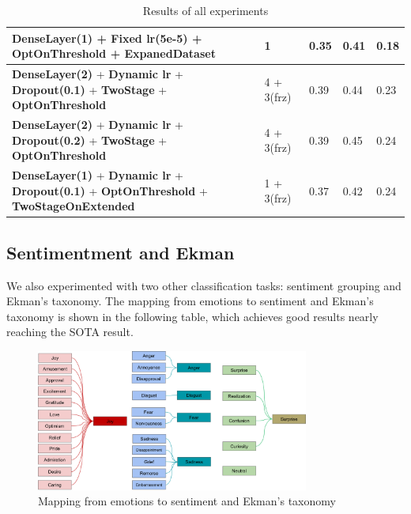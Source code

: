 \documentclass{article}
\begin{document}
\begin{table}[H]
\begin{tabular}{p{}p{}p{}p{}p{}}
    \hline
    \textbf{DenseLayer(1)} + \textbf{Fixed lr(5e-5)} + \textbf{OptOnThreshold} + \textbf{ExpanedDataset}                         & 1               & 0.35          & 0.41          & 0.18         \\
    \hline
    \textbf{DenseLayer(2)} + \textbf{Dynamic lr} + \textbf{Dropout(0.1)} + \textbf{TwoStage} + \textbf{OptOnThreshold}           & 4 + 3(frz)      & 0.39          & 0.44          & 0.23         \\
    \hline
    \textbf{DenseLayer(2)} + \textbf{Dynamic lr} + \textbf{Dropout(0.2)} + \textbf{TwoStage} + \textbf{OptOnThreshold}           & 4 + 3(frz)      & 0.39          & 0.45          & 0.24         \\
    \hline
    \textbf{DenseLayer(1)} + \textbf{Dynamic lr} + \textbf{Dropout(0.1)} + \textbf{OptOnThreshold} + \textbf{TwoStageOnExtended} & 1 + 3(frz)      & 0.37          & 0.42          & 0.24         \\
    \hline
  \end{tabular}
  \vspace{0.2cm}
  \caption{Results of all experiments}
\end{table}

\subsection{Sentimentment and Ekman}

We also experimented with two other classification tasks: sentiment grouping and Ekman's taxonomy. The mapping from emotions to sentiment and Ekman's taxonomy is shown in the following table, which achieves good results nearly reaching the SOTA result.

\begin{figure}[H]
  \centering
  \includegraphics[width=0.8\textwidth]{img1.png}
  \caption{Mapping from emotions to sentiment and Ekman's taxonomy}
\end{figure}
\end{document}
